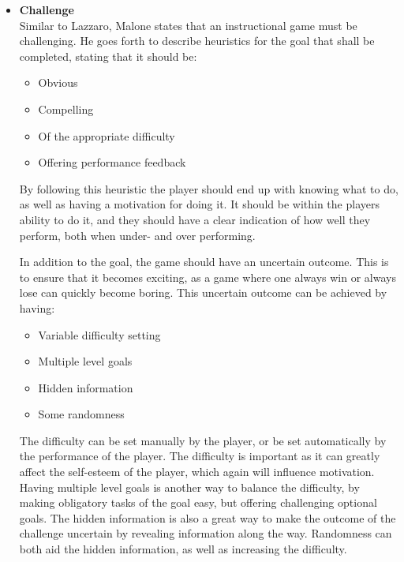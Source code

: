         \begin{itemize}
            \item \textbf{Challenge}\\
            Similar to Lazzaro, Malone states that an instructional game must be challenging. He goes forth to describe heuristics for the goal that shall be completed, stating that it should be:
            
            \begin{itemize}
                \item Obvious
                
                \item Compelling
                
                \item Of the appropriate difficulty
                
                \item Offering performance feedback
            \end{itemize}
            
            By following this heuristic the player should end up with knowing what to do, as well as having a motivation for doing it. It should be within the players ability to do it, and they should have a clear indication of how well they perform, both when under- and over performing.
            
            In addition to the goal, the game should have an uncertain outcome. This is to ensure that it becomes exciting, as a game where one always win or always lose can quickly become boring. This uncertain outcome can be achieved by having:
            
            \begin{itemize}
                \item Variable difficulty setting
                
                \item Multiple level goals
                
                \item Hidden information
                
                \item Some randomness
            \end{itemize}
            
            The difficulty can be set manually by the player, or be set automatically by the performance of the player. The difficulty is important as it can greatly affect the self-esteem of the player, which again will influence motivation. Having multiple level goals is another way to balance the difficulty, by making obligatory tasks of the goal easy, but offering challenging optional goals. The hidden information is also a great way to make the outcome of the challenge uncertain by revealing information along the way. Randomness can both aid the hidden information, as well as increasing the difficulty.
            

\end{itemize}
